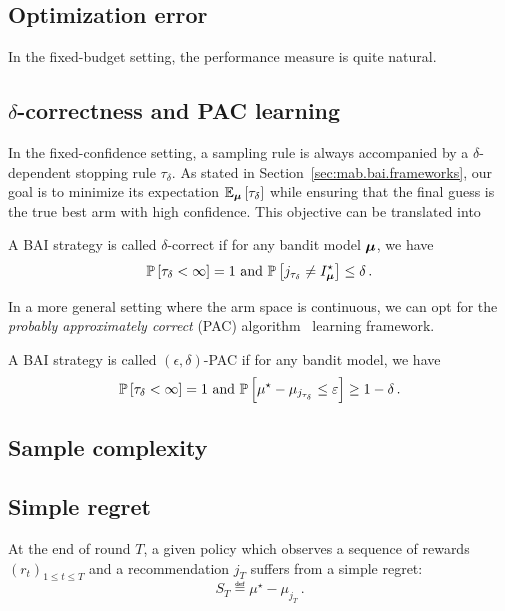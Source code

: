 \subsection{Optimization error}\label{sec:mab.performance.optim}

In the fixed-budget setting, the performance measure is quite natural.

\subsection{$\delta$-correctness and PAC learning}\label{sec:mab.performance.pac}

In the fixed-confidence setting, a sampling rule is always accompanied by a $\delta$-dependent stopping rule $\tau_{\delta}$. As stated in Section~\ref{sec:mab.bai.frameworks}, our goal is to minimize its expectation $\mathbb{E}_{{\boldsymbol \mu}}\left[\tau_{\delta}\right]$ while ensuring that the final guess is the true best arm with high confidence. This objective can be translated into

\begin{definition}
\begin{leftbar}[defnbar]
A BAI strategy is called $\delta$-correct if for any bandit model ${\boldsymbol \mu}$, we have
\[
	\mathbb{P}\left[\tau_\delta < \infty\right] = 1 \text{ and } \mathbb{P}\left[j_{\tau_\delta}\neq I_{{\boldsymbol \mu}}^{\star}\right] \leq \delta\,.
\]
\end{leftbar}
\end{definition}

In a more general setting where the arm space is continuous, we can opt for the \emph{probably approximately correct} (PAC) algorithm~\citep{valiant1984pac} learning framework.

\begin{definition}
\begin{leftbar}[defnbar]
A BAI strategy is called $(\epsilon,\delta)$-PAC if for any bandit model, we have
\[
	\mathbb{P}\left[\tau_\delta < \infty\right] = 1 \text{ and } \mathbb{P}\left[\mu^\star-\mu_{j_{\tau_\delta}}\leq \varepsilon\right] \geq 1-\delta\,.
\]
\end{leftbar}
\end{definition}

\subsection{Sample complexity}\label{sec:mab.performance.sample}

\subsection{Simple regret}\label{sec:mab.performance.simple}

\begin{definition}\label{def:stoch_mab.simple_regret}
\begin{leftbar}[defnbar]
	At the end of round $T$, a given policy which observes a sequence of rewards $(r_t)_{1 \leq t \leq T}$ and a recommendation $j_T$ suffers from a simple regret:
	\[
		S_T \eqdef \mu^{\star} - \mu_{j_T}\,.
	\]
\end{leftbar}
\end{definition}